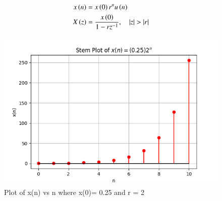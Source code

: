\documentclass[journal,12pt,twocolumn]{IEEEtran}
\theoremstyle{remark}
\begin{document}
\begin{align}
    x\brak{n} &= x\brak{0}r^{n} u\brak{n}\\
    X\brak{z} &= \frac{x\brak{0}}{1-rz^{-1}}, \quad |z|>|r|
\end{align}

\begin{figure}[htbp]
   \centering
   \includegraphics[width=1\columnwidth]{figs/gp.png}
   \caption{Plot of x(n) vs n where x(0)= 0.25 and r = 2}
   \label{fig: Stem plot of x(n)}
\end{figure}
\end{document}
